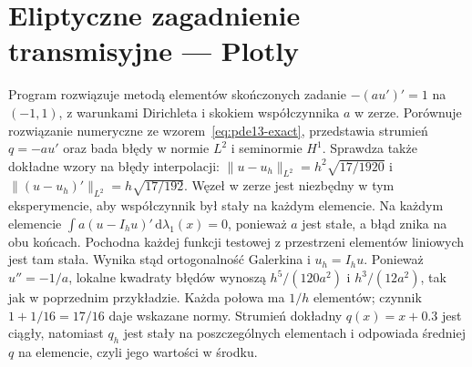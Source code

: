 \section{Eliptyczne zagadnienie transmisyjne — Plotly}
\label{sec:pde13-code}
Program rozwiązuje metodą elementów skończonych zadanie
$-(a u')'=1$ na $(-1,1)$, z warunkami Dirichleta i skokiem
współczynnika $a$ w zerze. Porównuje rozwiązanie numeryczne ze
wzorem~\eqref{eq:pde13-exact}, przedstawia strumień
$q=-a u'$ oraz bada błędy w normie $L^2$ i seminormie $H^1$.
Sprawdza także dokładne wzory na błędy interpolacji:
$\|u-u_h\|_{L^2}=h^2\sqrt{17/1920}$ i
$\|(u-u_h)'\|_{L^2}=h\sqrt{17/192}$.
Węzeł w zerze jest niezbędny w tym eksperymencie,
aby współczynnik był stały na każdym elemencie.
Na każdym elemencie $\int a(u-I_hu)'\,\mathrm d\lambda_1(x)=0$,
ponieważ $a$ jest stałe, a błąd znika na obu końcach.
Pochodna każdej funkcji testowej z przestrzeni elementów
liniowych jest tam stała. Wynika stąd ortogonalność
Galerkina i $u_h=I_hu$.
Ponieważ $u''=-1/a$, lokalne kwadraty błędów
wynoszą $h^5/(120a^2)$ i $h^3/(12a^2)$,
tak jak w poprzednim przykładzie. Każda połowa ma
$1/h$ elementów; czynnik $1+1/16=17/16$
daje wskazane normy.
Strumień dokładny $q(x)=x+0.3$ jest ciągły,
natomiast $q_h$ jest stały na poszczególnych
elementach i odpowiada średniej $q$ na elemencie,
czyli jego wartości w środku.
